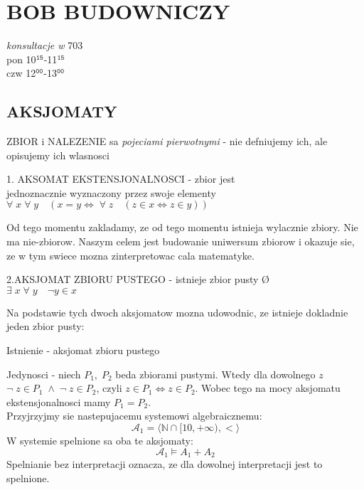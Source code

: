 \documentclass{article}
\newcommand{\N}{\mathbb{N}}
\begin{document}
\pagecolor{back}\color{txt}\ttfamily
\section*{BOB BUDOWNICZY}
\begin{center}
    \emph{konsultacje w }703\\
    pon 10$^\texttt{15}$-11$^\texttt{15}$\\
    czw 12$^\texttt{00}$-13$^\texttt{00}$
\end{center}
\subsection*{AKSJOMATY}
  \color{def}ZBIOR \color{txt}i \color{def}NALEZENIE \color{txt}sa \color{emp}\emph{pojeciami pierwotnymi} \color{txt}- nie defniujemy ich, ale opisujemy ich wlasnosci\bigskip
  \begin{center}
    \color{tit}1. AKSOMAT EKSTENSJONALNOSCI \color{txt}- zbior jest \\jednoznacznie wyznaczony przez swoje elementy\smallskip\\
    $\forall\;x\;\forall\;y\quad (x=y \iff\;\forall\; z\quad (z\in x\iff z\in y))$
  \end{center}
  \color{acc}Od tego momentu zakladamy, ze od tego momentu istnieja wylacznie zbiory. \color{txt}Nie ma nie-zbiorow. Naszym celem jest budowanie uniwersum zbiorow i okazuje sie, ze w tym swiece mozna zinterpretowac cala matematyke.\bigskip
  \begin{center}
    \color{tit}2.AKSJOMAT ZBIORU PUSTEGO \color{txt}- istnieje zbior pusty \O\smallskip\\
    $\exists\;x\;\forall\;y\quad \neg y\in x$
  \end{center}
  Na podstawie tych dwoch aksjomatow mozna udowodnic, ze \color{emp}istnieje dokladnie jeden zbior pusty\color{txt}:\smallskip\par
    Istnienie - aksjomat zbioru pustego\par
    Jedynosci - niech $P_1,\;P_2$ beda zbiorami pustymi. Wtedy dla dowolnego $z$ $\neg\;z\in P_1\;\land\;\neg\;z\in P_2$, czyli $z\in P_1\iff z\in P_2$. Wobec tego na mocy aksjomatu ekstensjonalnosci mamy $P_1=P_2$.\bigskip\\
  Przyjrzyjmy sie nastepujacemu systemowi algebraicznemu:
  $$\mathcal{A}_1 =\langle \N\cap[10, +\infty), <\rangle$$
  W systemie spelnione sa oba te aksjomaty:
  $$\mathcal{A}_1\models A_1+A_2$$
  Spelnianie bez interpretacji oznacza, ze dla dowolnej interpretacji jest to spelnione.\bigskip
\end{document}
